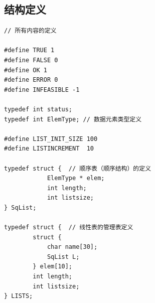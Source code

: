 \documentclass[supercite]{Experimental_Report}
\theoremstyle{definition}
\begin{document}
\subsection{结构定义}
\begin{lstlisting}
// 所有内容的定义

#define TRUE 1
#define FALSE 0
#define OK 1
#define ERROR 0
#define INFEASIBLE -1

typedef int status;
typedef int ElemType; // 数据元素类型定义

#define LIST_INIT_SIZE 100
#define LISTINCREMENT  10

typedef struct {  // 顺序表（顺序结构）的定义
            ElemType * elem;
            int length;
            int listsize;
} SqList;

typedef struct {  // 线性表的管理表定义
        struct { 
            char name[30];
            SqList L;	
        } elem[10];
        int length;
        int listsize;
} LISTS;

\end{lstlisting}

\newpage
\end{document}
